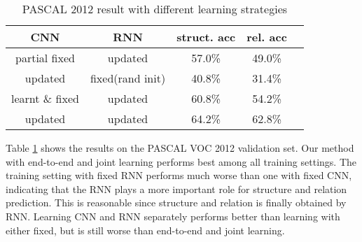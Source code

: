 \documentclass[10pt,twocolumn,letterpaper]{article}
\begin{document}
\begin{table}[!ht]\small
\begin{center}
\begin{tabular}{|c|c|c|c|c|}

\hline
CNN & RNN & struct. acc & rel. acc \\
\hline
partial fixed & updated & 57.0\% & 49.0\% \\
\hline
updated & fixed(rand init) & 40.8\% & 31.4\% \\
\hline
learnt \& fixed & updated & 60.8\% & 54.2\% \\
\hline
updated & updated & 64.2\% & 62.8\% \\
\hline

\end{tabular}
\end{center}
\caption{PASCAL 2012 result with different learning strategies}
\label{tbl:result_end_to_end_learning}
\vspace{-2mm}
\end{table}


Table \ref{tbl:result_end_to_end_learning} shows the results on the PASCAL VOC 2012 validation set. Our method with end-to-end and joint learning performs best among all training settings. The training setting with fixed RNN performs much worse than one with fixed CNN, indicating that the RNN plays a more important role for structure and relation prediction. This is reasonable since structure and relation is finally obtained by RNN. Learning CNN and RNN separately performs better than learning with either fixed, but is still worse than end-to-end and joint learning.



\end{document}
